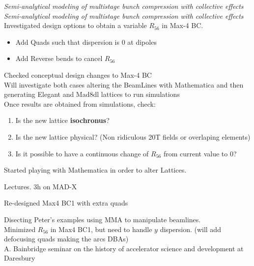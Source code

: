 \emph{Semi-analytical modeling of multistage bunch compression with collective effects}\\

\emph{Semi-analytical modeling of multistage bunch compression with collective effects}\\
Investigated design options to obtain a variable $R_{56}$ in Max-4 BC. \\
\begin{itemize}
    \item Add Quads such that dispersion is 0 at dipoles
    \item Add Reverse bends to cancel $R_{56}$
\end{itemize}

Checked conceptual design changes to Max-4 BC\\
Will investigate both cases altering the BeamLines with Mathematica and then generating Elegant and Mad8dl lattices to run simulations\\
Once results are obtained from simulations, check:
\begin{enumerate}
    \item Is the new lattice \textbf{isochronus}?
    \item Is the new lattice physical? (Non ridiculous 20T fields or overlaping elements)
    \item Is it possible to have a continuous change of $R_{56}$ from current value to 0?
\end{enumerate}
Started playing with Mathematica in order to alter Lattices.


Lectures. 3h on MAD-X\\


Re-designed Max4 BC1 with extra quads\\


Disecting Peter's examples using MMA to manipulate beamlines.\\
Minimized $R_{56}$ in Max4 BC1, but need to handle $y$ dispersion. (will add defocusing quads making the arcs DBAs)\\
A. Bainbridge seminar on the history of accelerator science and development at Daresbury\\


